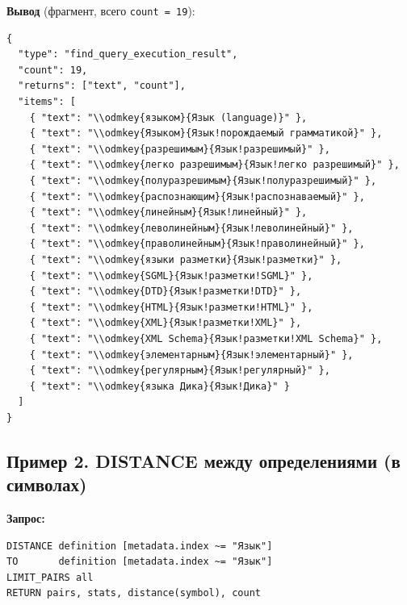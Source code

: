 \documentclass[12pt,a4paper]{article}
\newcommand{\code}[1]{\texttt{#1}}
\begin{document}
\textbf{Вывод} (фрагмент, всего \code{count = 19}):
\begin{Verbatim}[fontsize=\scriptsize,frame=single]
{
  "type": "find_query_execution_result",
  "count": 19,
  "returns": ["text", "count"],
  "items": [
    { "text": "\\odmkey{языком}{Язык (language)}" },
    { "text": "\\odmkey{Языком}{Язык!порождаемый грамматикой}" },
    { "text": "\\odmkey{разрешимым}{Язык!разрешимый}" },
    { "text": "\\odmkey{легко разрешимым}{Язык!легко разрешимый}" },
    { "text": "\\odmkey{полуразрешимым}{Язык!полуразрешимый}" },
    { "text": "\\odmkey{распознающим}{Язык!распознаваемый}" },
    { "text": "\\odmkey{линейным}{Язык!линейный}" },
    { "text": "\\odmkey{леволинейным}{Язык!леволинейный}" },
    { "text": "\\odmkey{праволинейным}{Язык!праволинейный}" },
    { "text": "\\odmkey{языки разметки}{Язык!разметки}" },
    { "text": "\\odmkey{SGML}{Язык!разметки!SGML}" },
    { "text": "\\odmkey{DTD}{Язык!разметки!DTD}" },
    { "text": "\\odmkey{HTML}{Язык!разметки!HTML}" },
    { "text": "\\odmkey{XML}{Язык!разметки!XML}" },
    { "text": "\\odmkey{XML Schema}{Язык!разметки!XML Schema}" },
    { "text": "\\odmkey{элементарным}{Язык!элементарный}" },
    { "text": "\\odmkey{регулярным}{Язык!регулярный}" },
    { "text": "\\odmkey{языка Дика}{Язык!Дика}" }
  ]
}
\end{Verbatim}

\subsection{Пример 2. DISTANCE между определениями (в символах)}

\textbf{Запрос:}
\begin{Verbatim}[fontsize=\small,frame=single,formatcom=\color{dslkw}]
DISTANCE definition [metadata.index ~= "Язык"]
TO       definition [metadata.index ~= "Язык"]
LIMIT_PAIRS all
RETURN pairs, stats, distance(symbol), count
\end{Verbatim}
\end{document}
